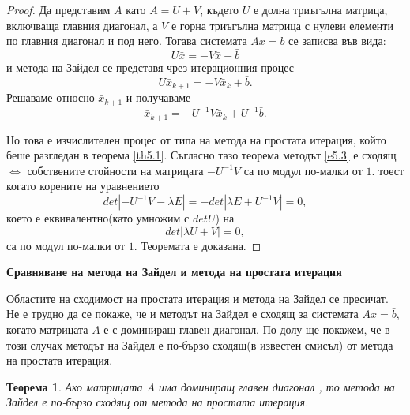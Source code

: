 \documentclass[12pt]{article}
\numberwithin{equation}{section}
\newtheorem{theorem}{Теорема}
\numberwithin{theorem}{section}
\numberwithin{definition}{section}
\numberwithin{corollary}{section}
\begin{document}
\begin{proof}
Да представим $A$ като $A=U+V$, където $U$ е долна триъгълна матрица, включваща главния диагонал, а $V$ е горна триъгълна матрица с нулеви елементи по главния диагонал и под него. Тогава системата $A\bar{x}=\bar{b}$ се записва във вида:
\[
U\bar{x}=-V\bar{x}+\bar{b}
\]
и метода на Зайдел се представя чрез итерационния процес
\[
U\bar{x}_{k+1}=-V\bar{x}_k+\bar{b}.
\]
Решаваме относно $\bar{x}_{k+1}$ и получаваме
\begin{equation}\label{e5.3}
\bar{x}_{k+1}=-U^{-1}V\bar{x}_k+U^{-1}\bar{b}.
\end{equation}
\par
Но това е изчислителен процес от типа на метода на простата итерация, който беше разгледан в теорема \ref{th5.1}. Съгласно тазо теорема методът \ref{e5.3} е сходящ $\iff$ собствените стойности на матрицата $-U^{-1}V$ са по модул по-малки от $1$. тоест когато корените на уравнението
\[
det|-U^{-1}V-\lambda E|=-det|\lambda E + U^{-1}V|=0,
\]
което е еквивалентно(като умножим с $detU$) на 
\[
det|\lambda U + V|=0,
\]
са по модул по-малки от $1$. Теоремата е доказана.
\end{proof}
\begin{center}
\textbf{Сравняване на метода на Зайдел и метода на простата итерация}
\end{center}
\par
Областите на сходимост на простата итерация и метода на Зайдел се пресичат. Не е трудно да се покаже, че и методът на Зайдел е сходящ за системата $A\bar{x}=\bar{b}$, когато матрицата $A$ е с доминиращ главен диагонал. По долу ще покажем, че в този случах методът на Зайдел е по-бързо сходящ(в известен смисъл) от метода на простата итерация.
\begin{theorem}\label{th5.3}
Ако матрицата $A$ има доминиращ главен диагонал , то метода на Зайдел е по-бързо сходящ от метода на простата итерация.
\end{theorem}
\end{document}
